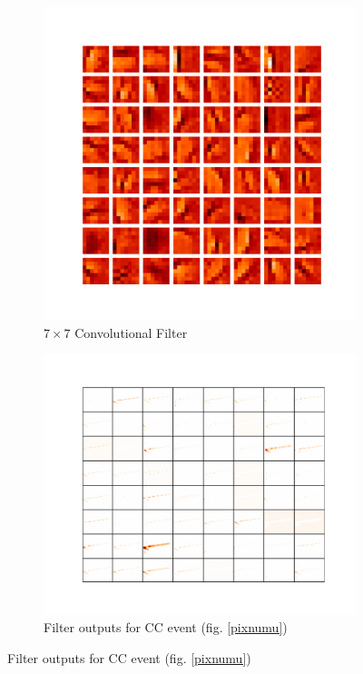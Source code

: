 \begin{figure}[t]
\begin{center}

\begin{subfigure}[b]{0.49\textwidth}
\includegraphics[width=\textwidth]{figures/cnn/conv1y.pdf}
\caption*{$7\times7$ Convolutional Filter}
\end{subfigure}
\begin{subfigure}[b]{0.49\textwidth}
\includegraphics[width=\textwidth]{figures/cnn/feat1_truetype2_caltype2_event274_y.pdf}
\caption*{Filter outputs for \numu CC event (fig. \ref{pixnumu})}
\end{subfigure}


\end{center}
\end{figure}

